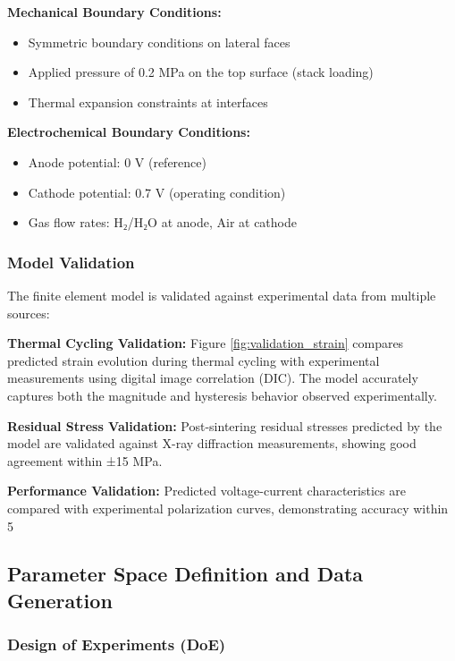 \documentclass[conference]{IEEEtran}
\begin{document}
\textbf{Mechanical Boundary Conditions:}
\begin{itemize}
\item Symmetric boundary conditions on lateral faces
\item Applied pressure of 0.2 MPa on the top surface (stack loading)
\item Thermal expansion constraints at interfaces
\end{itemize}

\textbf{Electrochemical Boundary Conditions:}
\begin{itemize}
\item Anode potential: 0 V (reference)
\item Cathode potential: 0.7 V (operating condition)
\item Gas flow rates: H₂/H₂O at anode, Air at cathode
\end{itemize}

\subsubsection{Model Validation}

The finite element model is validated against experimental data from multiple sources:

\textbf{Thermal Cycling Validation:} Figure \ref{fig:validation_strain} compares predicted strain evolution during thermal cycling with experimental measurements using digital image correlation (DIC). The model accurately captures both the magnitude and hysteresis behavior observed experimentally.

\textbf{Residual Stress Validation:} Post-sintering residual stresses predicted by the model are validated against X-ray diffraction measurements, showing good agreement within ±15 MPa.

\textbf{Performance Validation:} Predicted voltage-current characteristics are compared with experimental polarization curves, demonstrating accuracy within 5%

\subsection{Parameter Space Definition and Data Generation}

\subsubsection{Design of Experiments (DoE)}
\end{document}
